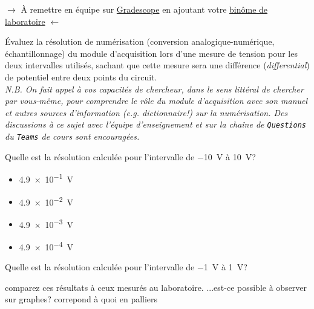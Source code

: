 \documentclass[canadien,12pt,oneside,letterpaper]{article}
\begin{document}
\vspace{-0.5cm}
\noindent$\rightarrow$ À remettre en équipe sur \href{https://www.gradescope.com/}{Gradescope} en ajoutant votre \href{https://help.gradescope.com/article/m5qz2xsnjy-student-add-group-members}{binôme de laboratoire} $\leftarrow$



\begin{gradescope}
\item Évaluez la résolution de numérisation (conversion analogique-numérique, échantillonnage) du module d'acquisition lors d'une mesure de tension pour les deux intervalles utilisés, sachant que cette mesure sera une différence (\textit{differential}) de potentiel entre deux points du circuit.\\ \textit{\footnotesize N.B. On fait appel à vos capacités de chercheur, dans le sens littéral de chercher par vous-même, pour comprendre le rôle du module d'acquisition avec son manuel et autres sources d'information (\emph{e.g.} dictionnaire!) sur la numérisation. Des discussions à ce sujet avec l'équipe d'enseignement et sur la chaîne de \texttt{Questions} du \texttt{Teams} de cours sont encouragées.}
    \begin{gradescope}
    \item Quelle est la résolution calculée pour l'intervalle de \SI{-10}{\volt} à \SI{10}{\volt}?
        \begin{itemize}[label=$\blacktriangleright$]
        \item \qty{4.9e-1}{\volt}
        \item \qty{4.9e-2}{\volt}
        \item \qty{4.9e-3}{\volt}
        \item \qty{4.9e-4}{\volt}
        \end{itemize}
    \item Quelle est la résolution calculée pour l'intervalle de \SI{-1}{\volt} à \SI{1}{\volt}?
    \item comparez ces résultats à ceux mesurés au laboratoire. ...est-ce possible à observer sur graphes? correpond à quoi  en palliers

\end{gradescope}
\end{gradescope}
\end{document}
